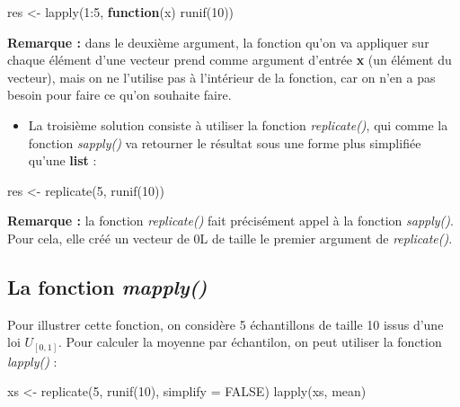 \documentclass[
]{book}
\newenvironment{Shaded}{\begin{snugshade}}{\end{snugshade}}
\newcommand{\AttributeTok}[1]{\textcolor[rgb]{0.77,0.63,0.00}{#1}}
\newcommand{\ConstantTok}[1]{\textcolor[rgb]{0.00,0.00,0.00}{#1}}
\newcommand{\ControlFlowTok}[1]{\textcolor[rgb]{0.13,0.29,0.53}{\textbf{#1}}}
\newcommand{\DecValTok}[1]{\textcolor[rgb]{0.00,0.00,0.81}{#1}}
\newcommand{\FunctionTok}[1]{\textcolor[rgb]{0.00,0.00,0.00}{#1}}
\newcommand{\NormalTok}[1]{#1}
\newcommand{\OtherTok}[1]{\textcolor[rgb]{0.56,0.35,0.01}{#1}}
\newcommand{\SpecialCharTok}[1]{\textcolor[rgb]{0.00,0.00,0.00}{#1}}
\providecommand{\tightlist}{%
  \setlength{\itemsep}{0pt}\setlength{\parskip}{0pt}}
\theoremstyle{definition}
\theoremstyle{definition}
\theoremstyle{definition}
\theoremstyle{definition}
\theoremstyle{remark}
\begin{document}
\begin{Shaded}
\begin{Highlighting}[]
\NormalTok{res }\OtherTok{\textless{}{-}} \FunctionTok{lapply}\NormalTok{(}\DecValTok{1}\SpecialCharTok{:}\DecValTok{5}\NormalTok{, }\ControlFlowTok{function}\NormalTok{(x) }\FunctionTok{runif}\NormalTok{(}\DecValTok{10}\NormalTok{))}
\end{Highlighting}
\end{Shaded}

\textbf{Remarque :} dans le deuxième argument, la fonction qu'on va appliquer sur chaque élément d'une vecteur prend comme argument d'entrée \textbf{x} (un élément du vecteur), mais on ne l'utilise pas à l'intérieur de la fonction, car on n'en a pas besoin pour faire ce qu'on souhaite faire.

\begin{itemize}
\tightlist
\item
  La troisième solution consiste à utiliser la fonction \emph{replicate()}, qui comme la fonction \emph{sapply()} va retourner le résultat sous une forme plus simplifiée qu'une \textbf{list} :
\end{itemize}

\begin{Shaded}
\begin{Highlighting}[]
\NormalTok{res }\OtherTok{\textless{}{-}} \FunctionTok{replicate}\NormalTok{(}\DecValTok{5}\NormalTok{, }\FunctionTok{runif}\NormalTok{(}\DecValTok{10}\NormalTok{))}
\end{Highlighting}
\end{Shaded}

\textbf{Remarque :} la fonction \emph{replicate()} fait précisément appel à la fonction \emph{sapply()}. Pour cela, elle créé un vecteur de 0L de taille le premier argument de \emph{replicate()}.

\hypertarget{la-fonction-mapply}{%
\subsection{\texorpdfstring{La fonction \emph{mapply()}}{La fonction mapply()}}\label{la-fonction-mapply}}

Pour illustrer cette fonction, on considère 5 échantillons de taille 10 issus d'une loi \(U_{[0,1]}\). Pour calculer la moyenne par échantilon, on peut utiliser la fonction \emph{lapply()} :

\begin{Shaded}
\begin{Highlighting}[]
\NormalTok{xs }\OtherTok{\textless{}{-}} \FunctionTok{replicate}\NormalTok{(}\DecValTok{5}\NormalTok{, }\FunctionTok{runif}\NormalTok{(}\DecValTok{10}\NormalTok{), }\AttributeTok{simplify =} \ConstantTok{FALSE}\NormalTok{)}
\FunctionTok{lapply}\NormalTok{(xs, mean)}
\end{Highlighting}
\end{Shaded}
\end{document}
